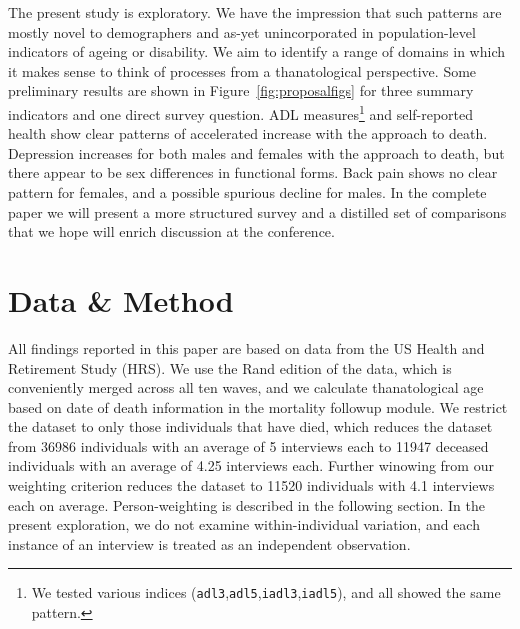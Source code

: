 \documentclass{article}
\begin{document}
The present study is exploratory. We have the impression
that such patterns are mostly novel to demographers and as-yet unincorporated in
population-level indicators of ageing or disability. We aim to identify a
range of domains in which it makes sense to think of processes from a
thanatological perspective. Some preliminary results are shown in
Figure~\ref{fig:proposalfigs} for three summary indicators and one direct survey
question. ADL measures\footnote{We tested various indices
(\texttt{adl3},\texttt{adl5},\texttt{iadl3},\texttt{iadl5}), and all showed the
same pattern.} and self-reported health show clear patterns of
accelerated increase with the approach to death. Depression increases for both
males and females with the approach to death, but there appear to be sex
differences in functional forms. Back pain shows no clear pattern for females,
and a possible spurious decline for males. In the complete paper we will present a
more structured survey and a distilled set of comparisons that we hope will
enrich discussion at the conference. 


\section{Data \& Method}
All findings reported in this paper are based on data from the US Health and
Retirement Study (HRS). We use the Rand edition of the data, which is
conveniently merged across all ten waves, and we calculate thanatological age
based on date of death information in the mortality followup module. We
restrict the dataset to only those individuals that have died, which reduces the
dataset from 36986 individuals with an average of 5 interviews each to 11947
deceased individuals with an average of 4.25 interviews each. Further winowing
from our weighting criterion reduces the dataset to
11520 individuals with 4.1 interviews each on average. Person-weighting is
described in the following section. In the present exploration, we do not examine
within-individual variation, and each instance of an interview is treated as an
independent observation.
\end{document}
